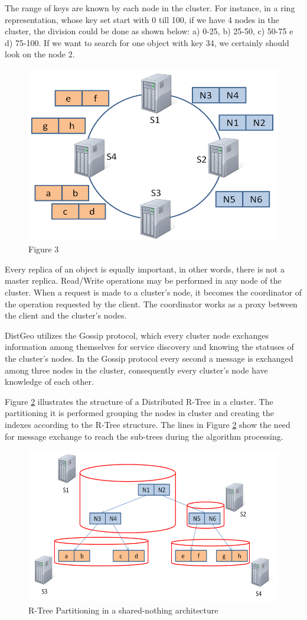 	The range of keys are known by each node in the cluster. For instance, in a ring representation, whose key set start with 0 till 100, if we have 4 nodes in the cluster, the division could be done as shown below: a) 0-25, b) 25-50, c) 50-75 e d) 75-100. If we want to search for one object with key 34, we certainly should look on the node 2.

\begin{figure}[ht]
\centering
\includegraphics[width=.5\textwidth]{figure3.png}
\caption{Figure 3}
\label{fig: Figure 3}
\end{figure}
	
	Every replica of an object is equally important, in other words, there is not a master replica. Read/Write operations may be performed in any node of the cluster. When a request is made to a cluster's node, it becomes the coordinator of the operation requested by the client. The coordinator works as a proxy between the client and the cluster's nodes. 
	
	DistGeo utilizes the Gossip protocol, which every cluster node exchanges information among themselves for service discovery and knowing the statuses of the cluster's nodes. In the Gossip protocol every second a message is exchanged among three nodes in the cluster, consequently every cluster's node have knowledge of each other. 

Figure \ref{fig:partitioning} illustrates the structure of a Distributed R-Tree in a cluster. The partitioning it is performed grouping the nodes in cluster and creating the indexes according to the R-Tree structure. The lines in Figure \ref{fig:partitioning} show the need for message exchange to reach the sub-trees during the algorithm processing. 

\begin{figure}[ht]
\centering
\includegraphics[width=.5\textwidth]{r-tree-partiotioning.png}
\caption{R-Tree Partitioning in a shared-nothing architecture}
\label{fig:partitioning}
\end{figure}

